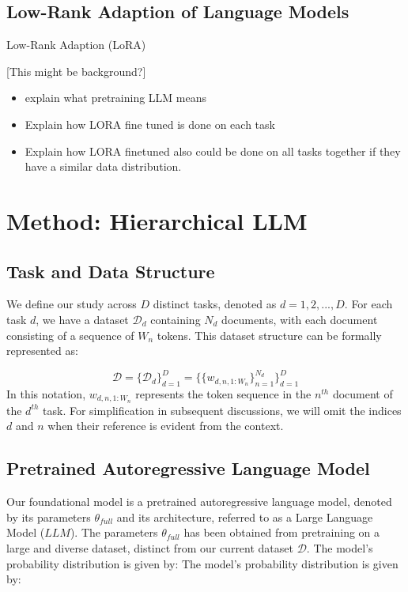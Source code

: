 \documentclass{article}
\begin{document}
\subsection{Low-Rank Adaption of Language Models}
Low-Rank Adaption (LoRA)

[This might be background?]
\begin{itemize}
    \item explain what pretraining LLM means
    \item Explain how LORA fine tuned is done on each task
    \item Explain how LORA finetuned also could be done on all tasks together if they have a similar data distribution.
\end{itemize}

\section{Method: Hierarchical LLM}

\subsection{Task and Data Structure}
We define our study across $D$ distinct tasks, denoted as $d=1,2,...,D$. For each task $d$, we have a dataset $\mathcal{D}_d$ containing $N_d$ documents, with each document consisting of a sequence of $W_n$ tokens. This dataset structure can be formally represented as:

\begin{equation} \label{eq:data}
\mathcal{D} = \{ \mathcal{D}_d \}_{d=1}^D  =  \{ \{ w_{d,n,1:W_n} \}_{n=1}^{N_d} \}_{d=1}^D
\end{equation}
%
In this notation, $w_{d,n,1:W_n}$ represents the token sequence in the $n^{th}$ document of the $d^{th}$ task. For simplification in subsequent discussions, we will omit the indices $d$ and $n$ when their reference is evident from the context.

\subsection{Pretrained Autoregressive Language Model}
Our foundational model is a pretrained autoregressive language model, denoted by its parameters $\theta_{full}$ and its architecture, referred to as a Large Language Model ($LLM$). The parameters $\theta_{full}$ has been obtained from pretraining on a large and diverse dataset, distinct from our current dataset $\mathcal{D}$. The model's probability distribution is given by:
The model's probability distribution is given by:
\end{document}

